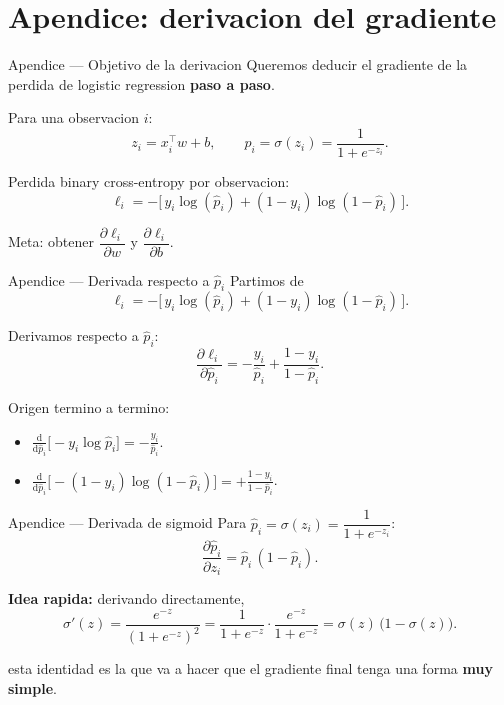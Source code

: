 \section[Apendice]{Apendice: derivacion del gradiente\label{sec:apendice-w11}}

\begin{frame}{Apendice — Objetivo de la derivacion}
Queremos deducir el gradiente de la perdida de logistic regression \textbf{paso a paso}.

\vspace{0.25em}
Para una observacion $i$:
\[
z_i = x_i^\top w + b,\qquad
\hat p_i = \sigma(z_i) = \frac{1}{1+e^{-z_i}}.
\]

\vspace{0.2em}
Perdida binary cross-entropy por observacion:
\[
\ell_i = -\big[\,y_i\log(\hat p_i) + (1-y_i)\log(1-\hat p_i)\,\big].
\]

\vspace{0.2em}
Meta: obtener $\dfrac{\partial \ell_i}{\partial w}$ y $\dfrac{\partial \ell_i}{\partial b}$.
\end{frame}

\begin{frame}{Apendice — Derivada respecto a $\hat p_i$}
Partimos de
\[
\ell_i = -\big[\,y_i\log(\hat p_i) + (1-y_i)\log(1-\hat p_i)\,\big].
\]

\vspace{0.2em}
Derivamos respecto a $\hat p_i$:
\[
\frac{\partial \ell_i}{\partial \hat p_i}
= -\frac{y_i}{\hat p_i} + \frac{1-y_i}{1-\hat p_i}.
\]

\vspace{0.25em}
Origen termino a termino:
\begin{itemize}\footnotesize
  \item $\tfrac{\mathrm{d}}{\mathrm{d}\hat p_i}\big[-y_i\log\hat p_i\big] = -\tfrac{y_i}{\hat p_i}$.
  \item $\tfrac{\mathrm{d}}{\mathrm{d}\hat p_i}\big[-(1-y_i)\log(1-\hat p_i)\big] = +\tfrac{1-y_i}{1-\hat p_i}$.
\end{itemize}
\end{frame}

\begin{frame}{Apendice — Derivada de sigmoid}
Para $\hat p_i = \sigma(z_i) = \dfrac{1}{1+e^{-z_i}}$:
\[
\frac{\partial \hat p_i}{\partial z_i} = \hat p_i\,(1 - \hat p_i).
\]

\vspace{0.3em}
\textbf{Idea rapida:} derivando directamente,
\[
\sigma'(z) = \frac{e^{-z}}{(1+e^{-z})^2}
= \frac{1}{1+e^{-z}}\cdot\frac{e^{-z}}{1+e^{-z}}
= \sigma(z)\,\big(1-\sigma(z)\big).
\]

\vspace{0.3em}
 esta identidad es la que va a hacer que el gradiente final tenga una forma \textbf{muy simple}.
\end{frame}

